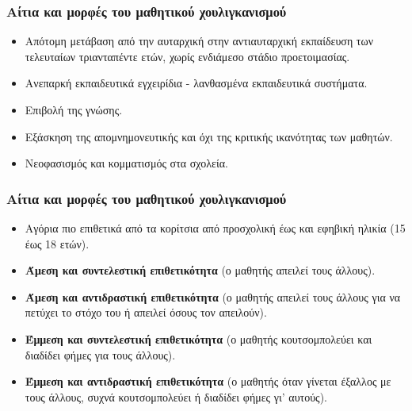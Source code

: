 \documentclass[hyperref={pdfpagelabels=false}, t]{beamer}
\let\olditem=\item%
\renewcommand{\item}{\olditem \justifying}%
\begin{document}
%
%

\begin{frame}[t]
\frametitle{Αίτια και μορφές του μαθητικού χουλιγκανισμού}
\vspace{-18.5pt}
\begin{adjustwidth}{-0.7cm}{}
\justifying
\begin{itemize}
\item Απότομη μετάβαση από την αυταρχική στην αντιαυταρχική εκπαίδευση των
τελευταίων τριανταπέντε ετών, χωρίς ενδιάμεσο στάδιο
προετοιμασίας.\setlength{\itemsep}{15pt}
\item Ανεπαρκή εκπαιδευτικά εγχειρίδια - λανθασμένα
εκπαιδευτικά συστήματα. \setlength{\itemsep}{15pt}
\item Επιβολή της γνώσης. \setlength{\itemsep}{15pt}
\item Εξάσκηση της απομνημονευτικής και όχι
της κριτικής ικανότητας των μαθητών. \setlength{\itemsep}{15pt}
\item Νεοφασισμός και κομματισμός στα σχολεία. \setlength{\itemsep}{15pt}
\end{itemize}
\end{adjustwidth}
\end{frame}

%
%

\begin{frame}[t]
\frametitle{Αίτια και μορφές του μαθητικού χουλιγκανισμού}
\vspace{-18.5pt}
\begin{adjustwidth}{-0.7cm}{}
\justifying
\begin{itemize}
\item Αγόρια πιο επιθετικά από τα κορίτσια από προσχολική έως και εφηβική ηλικία
(15 έως 18 ετών).  \setlength{\itemsep}{15pt}
\item \textbf{Άμεση και συντελεστική επιθετικότητα} (ο μαθητής απειλεί τους
άλλους).
\setlength{\itemsep}{15pt}
\item \textbf{Άμεση και αντιδραστική  επιθετικότητα} (ο μαθητής απειλεί τους
άλλους για να πετύχει το στόχο του ή απειλεί όσους τον απειλούν). \setlength{\itemsep}{15pt}
\item \textbf{Έμμεση και συντελεστική επιθετικότητα} (ο μαθητής κουτσομπολεύει
και διαδίδει φήμες για τους άλλους). \setlength{\itemsep}{15pt}
\item \textbf{Έμμεση και αντιδραστική επιθετικότητα} (ο μαθητής όταν γίνεται
έξαλλος με τους άλλους, συχνά κουτσομπολεύει ή διαδίδει φήμες γι’ αυτούς).
\setlength{\itemsep}{15pt}
\end{itemize}
\end{adjustwidth}
\end{frame}
\end{document}
